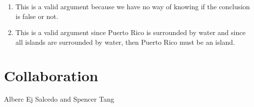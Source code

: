 \documentclass[11pt]{article}
\begin{document}
\begin{enumerate}
\item
This is a valid argument because we have no way of knowing if the conclusion is false or not.
\item
This is a valid argument since Puerto Rico is surrounded by water and since all islands are surrounded by water, then Puerto Rico must be an island.
\end{enumerate}

\section{Collaboration}
Alberc Ej Salcedo and Spencer Tang
\end{document}
